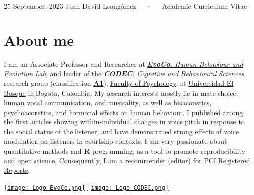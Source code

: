 \documentclass[11pt,a4paper,]{awesome-cv}
\begin{document}
\makecvheader

\makecvfooter
  {25 September, 2023}
    {Juan David Leongómez~~~·~~~Academic Curriculum Vitae}
  {\thepage}





\hypertarget{about-me}{%
\section{About me}\label{about-me}}

\begin{minipage}[c]{0.85\linewidth}
I am an Associate Professor and Researcher at \href{https://jdleongomez.info/en/team/}{\textit{\textbf{EvoCo}: Human Behaviour and Evolution Lab}}, and leader of the \href{https://investigaciones.unbosque.edu.co/codec}{\textit{\textbf{CODEC}: Cognitive and Behavioural Sciences}} research group (classification \href{https://scienti.minciencias.gov.co/gruplac/jsp/visualiza/visualizagr.jsp?nro=00000000001446}{\textbf{A1}}), \href{https://www.uelbosque.edu.co/psicologia}{Faculty of Psychology}, at \href{https://www.uelbosque.edu.co/}{Universidad El Bosque} in Bogota, Colombia. My research interests mostly lie in mate choice, human vocal communication, and musicality, as well as bioacoustics, psychoacoustics, and hormonal effects on human behaviour. I published among the first articles showing within-individual changes in voice pitch in response to the social status of the listener, and have demonstrated strong effects of voice modulation on listeners in courtship contexts. I am very passionate about quantitative methods and \textbf{R} programming, as a tool to promote reproducibility and open science. Consequently, I am a \href{https://rr.peercommunityin.org/about/recommenders}{recommender} (editor) for \href{https://rr.peercommunityin.org/}{PCI Registered Reports}.
\end{minipage} \begin{minipage}[c]{0.15\linewidth}
\begin{flushright} 
\hfill \href{https://jdleongomez.info/en/team/}{\texttt{[image: Logo\_EvoCo.png]}} \newline \href{https://investigaciones.unbosque.edu.co/codec}{\texttt{[image: Logo\_CODEC.png]}}
\end{flushright}
\end{minipage}
\end{document}
